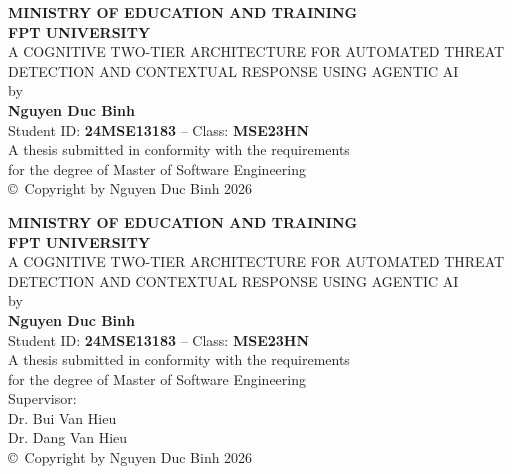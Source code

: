 \documentclass[12pt,a4paper]{report}
\begin{document}

\pagestyle{empty}

\begin{titlepage}
    \centering
    \vspace*{1cm}
    {\large\textbf{MINISTRY OF EDUCATION AND TRAINING}}\\[0.1cm]
    {\large\textbf{FPT UNIVERSITY}}\\[3cm]

    {\Large A COGNITIVE TWO-TIER ARCHITECTURE FOR AUTOMATED THREAT DETECTION AND CONTEXTUAL RESPONSE USING AGENTIC AI}\\[2.5cm]

    by\\[0.8cm]

    \textbf{Nguyen Duc Binh}\\[0.3cm]
    Student ID: \textbf{24MSE13183} -- Class: \textbf{MSE23HN}\\[2.5cm]

    A thesis submitted in conformity with the requirements\\
    for the degree of Master of Software Engineering\\[1cm]

    \vfill
    {\normalsize \copyright\ Copyright by Nguyen Duc Binh 2026}
\end{titlepage}

\begin{titlepage}
    \centering
    \vspace*{1cm}
    {\large\textbf{MINISTRY OF EDUCATION AND TRAINING}}\\[0.1cm]
    {\large\textbf{FPT UNIVERSITY}}\\[3cm]

    {\Large A COGNITIVE TWO-TIER ARCHITECTURE FOR AUTOMATED THREAT DETECTION AND CONTEXTUAL RESPONSE USING AGENTIC AI}\\[2.5cm]

    by\\[0.8cm]

    \textbf{Nguyen Duc Binh}\\[0.3cm]
    Student ID: \textbf{24MSE13183} -- Class: \textbf{MSE23HN}\\[2.5cm]

    A thesis submitted in conformity with the requirements\\
    for the degree of Master of Software Engineering\\[1.5cm]

    Supervisor:\\
    Dr. Bui Van Hieu\\
    Dr. Dang Van Hieu\\[1cm]

    \vfill
    {\normalsize \copyright\ Copyright by Nguyen Duc Binh 2026}
\end{titlepage}
\end{document}
